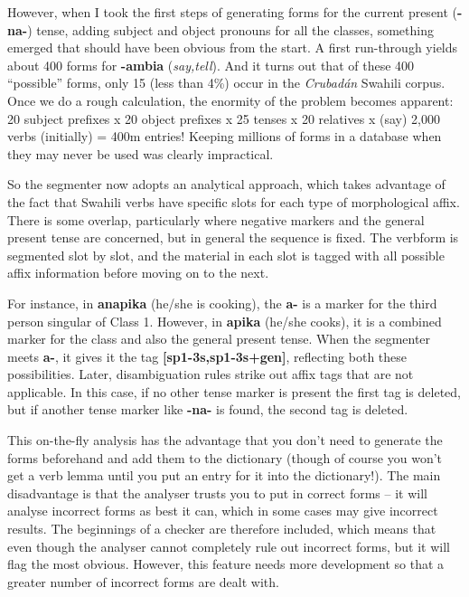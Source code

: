 \documentclass[a4paper,10pt]{article}
\begin{document}
However, when I took the first steps of generating forms for the current present (\textbf{-na-}) tense, adding subject and object pronouns for all the classes, something emerged that should have been obvious from the start.  A first run-through yields about 400 forms for \textbf{-ambia} (\textit{say,tell}). And it turns out that of these 400 ``possible'' forms, only 15 (less than 4\%) occur in the \textit{Crubadán} Swahili corpus. Once we do a rough calculation, the enormity of the problem becomes apparent: 20 subject prefixes x 20 object prefixes x 25 tenses x 20 relatives x (say) 2,000 verbs (initially) = 400m entries!  Keeping millions of forms in a database when they may never be used was clearly impractical.

So the segmenter now adopts an analytical approach, which takes advantage of the fact that Swahili verbs have specific slots for each type of morphological affix. There is some overlap, particularly where negative markers and the general present tense are concerned, but in general the sequence is fixed.  The verbform is segmented slot by slot, and the material in each slot is tagged with all possible affix information before moving on to the next.  

For instance, in \textbf{anapika} (he/she is cooking), the \textbf{a-} is a marker for the third person singular of Class 1.  However, in \textbf{apika} (he/she cooks), it is a combined marker for the class and also the general present tense.  When the segmenter meets \textbf{a-}, it gives it the tag \textbf{[sp1-3s,sp1-3s+gen]}, reflecting both these possibilities.  Later, disambiguation rules strike out affix tags that are not applicable.  In this case, if no other tense marker is present the first tag is deleted, but if another tense marker like \textbf{-na-} is found, the second tag is deleted.

This on-the-fly analysis has the advantage that you don’t need to generate the forms beforehand and add them to the dictionary (though of course you won’t get a verb lemma until you put an entry for it into the dictionary!).  The main disadvantage is that the analyser trusts you to put in correct forms -- it will analyse incorrect forms as best it can, which in some cases may give incorrect results.  The beginnings of a checker are therefore included, which means that even though the analyser cannot completely rule out incorrect forms, but it will flag the most obvious.  However, this feature needs more development so that a greater number of incorrect forms are dealt with.
\end{document}
